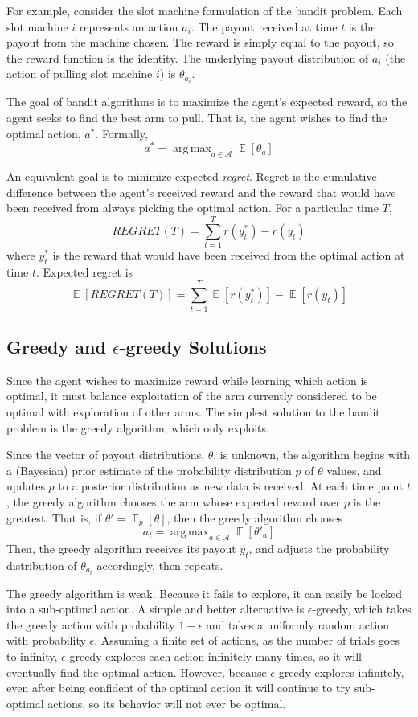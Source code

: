 \documentclass{article}
\DeclareMathOperator*{\argmax}{arg\,max}
\DeclareMathOperator{\EX}{\mathbb{E}}
\newcommand{\eps}{\epsilon}
\begin{document}
For example, consider the slot machine formulation of the bandit problem. Each slot machine $i$ represents an action $a_i$. The payout received at time $t$ is the payout from the machine chosen. The reward is simply equal to the payout, so the reward function is the identity. The underlying payout distribution of $a_i$ (the action of pulling slot machine $i$) is $\theta_{a_i}$.

The goal of bandit algorithms is to maximize the agent's expected reward, so the agent seeks to find the best arm to pull. That is, the agent wishes to find the optimal action, $a^*$. Formally, $$a^* = \argmax_{a\in\mathcal{A}} \EX[\theta_{a}]$$

An equivalent goal is to minimize expected \textit{regret}. Regret is the cumulative difference between the agent's received reward and the reward that would have been received from always picking the optimal action. For a particular time $T$,
$$REGRET(T) = \sum_{t=1}^T r(y^*_t) - r(y_t)$$
where $y^*_t$ is the reward that would have been received from the optimal action at time $t$. Expected regret is
$$\EX[REGRET(T)] = \sum_{t=1}^T \EX[r(y^*_t)] - \EX[r(y_t)]$$

\subsection{Greedy and $\eps$-greedy Solutions}

Since the agent wishes to maximize reward while learning which action is optimal, it must balance exploitation of the arm currently considered to be optimal with exploration of other arms. The simplest solution to the bandit problem is the greedy algorithm, which only exploits.

Since the vector of payout distributions, $\theta$, is unknown, the algorithm begins with a (Bayesian) prior estimate of the probability distribution $p$ of $\theta$ values, and updates $p$ to a posterior distribution as new data is received. At each time point $t$, the greedy algorithm chooses the arm whose expected reward over $p$ is the greatest. That is, if $\theta' = \EX_p[\theta]$, then the greedy algorithm chooses
$$a_t = \argmax_{a\in\mathcal{A}} \EX[\theta'_{a}]$$
Then, the greedy algorithm receives its payout $y_t$, and adjusts the probability distribution of $\theta_{a_t}$ accordingly, then repeats.

The greedy algorithm is weak. Because it fails to explore, it can easily be locked into a sub-optimal action. A simple and better alternative is $\eps$-greedy, which takes the greedy action with probability $1-\eps$ and takes a uniformly random action with probability $\eps$. Assuming a finite set of actions, as the number of trials goes to infinity, $\eps$-greedy explores each action infinitely many times, so it will eventually find the optimal action. However, because $\eps$-greedy explores infinitely, even after being confident of the optimal action it will continue to try sub-optimal actions, so its behavior will not ever be optimal.
\end{document}
